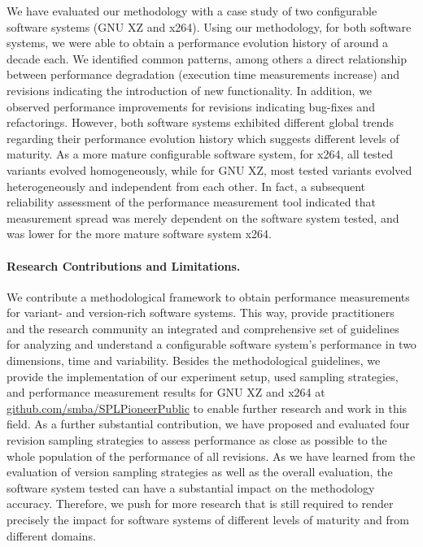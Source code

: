 We have evaluated our methodology with a case study of two configurable software
systems (GNU XZ and x264). Using our methodology, for both software systems, we
were able to obtain a performance evolution history  of around a decade each.
We identified common patterns, among others a direct relationship between
performance degradation (execution time measurements increase) and revisions
indicating the introduction of new functionality. In addition, we observed
performance improvements for revisions indicating bug-fixes and refactorings.
However, both software systems exhibited different global trends regarding
their performance evolution history which suggests different levels of
maturity. As a more mature configurable software system, for x264, all tested
variants evolved homogeneously, while for GNU XZ, most tested variants evolved
heterogeneously and independent from each other. In fact, a subsequent
reliability assessment of the performance measurement tool indicated that
measurement spread was merely dependent on the software system tested, and was
lower for the more mature software system x264.

\paragraph{Research Contributions and Limitations.} We contribute a
methodological framework to obtain performance measurements for variant- and
version-rich software systems. This way, provide practitioners and the
research community an integrated and comprehensive set of guidelines for
analyzing and understand a configurable software system’s performance in two
dimensions, time and variability. Besides the methodological guidelines, we
provide the implementation of our experiment setup, used sampling strategies,
and performance measurement results for GNU XZ and x264 at
\url{github.com/smba/SPLPioneerPublic} to enable further research and work in
this field. As a further substantial contribution, we have proposed and
evaluated four revision sampling strategies to assess performance as close as
possible to the whole population of the performance of all revisions.
As we have learned from the evaluation of version sampling strategies as well
as the overall evaluation, the software system tested can have a substantial
impact on the methodology accuracy. Therefore, we push for more research that
is still required to render precisely the impact for software systems of
different levels of maturity and from different domains.

